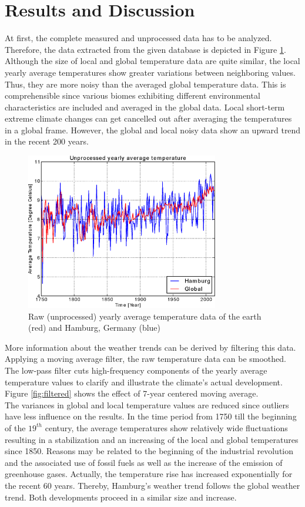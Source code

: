 \documentclass[a4paper]{article}
\begin{document}
\section{Results and Discussion}
At first, the complete measured and unprocessed data has to be analyzed. Therefore, the data extracted from the given database is depicted in Figure \ref{fig:noisy}. Although the size of local and global temperature data are quite similar, the local yearly average temperatures show greater variations between neighboring values. Thus, they are more noisy than the averaged global temperature data. This is comprehensible since various biomes exhibiting different environmental characteristics are included and averaged in the global data. Local short-term extreme climate changes can get cancelled out after averaging the temperatures in a global frame. However, the global and local noisy data show an upward trend in the recent 200 years.\\
\begin{figure}
\centering
\includegraphics[width=0.75\textwidth]{WeatherTrendsNoisy.eps}
\caption{\label{fig:noisy}Raw (unprocessed) yearly average temperature data of the earth (red) and Hamburg, Germany (blue)}
\end{figure}
More information about the weather trends can be derived by filtering this data. Applying a moving average filter, the raw temperature data can be smoothed. The low-pass filter cuts high-frequency components of the yearly average temperature values to clarify and illustrate the climate's actual development. Figure \ref{fig:filtered} shows the effect of 7-year centered moving average.\\
The variances in global and local temperature values are reduced since outliers have less influence on the results. In the time period from 1750 till the beginning of the $19^{th}$ century, the average temperatures show relatively wide fluctuations resulting in a stabilization and an increasing of the local and global temperatures since 1850. Reasons may be related to the beginning of the industrial revolution and the associated use of fossil fuels as well as the increase of the emission of greenhouse gases. Actually, the temperature rise has increased exponentially for the recent 60 years. Thereby, Hamburg's weather trend follows the global weather trend. Both developments proceed in a similar size and increase.
\end{document}
